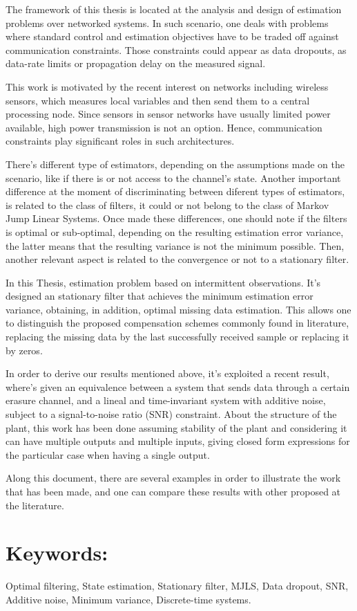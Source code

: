 The framework of this thesis is located at the analysis and design of estimation problems over networked systems. In such scenario, one deals with problems where standard control and estimation objectives have to be traded off against communication constraints. Those constraints could appear as data dropouts, as data-rate limits or propagation delay on the measured signal.

This work is motivated by the recent interest on networks including wireless sensors, which measures local variables and then send them to a central processing node. Since sensors in sensor networks have usually limited power available, high power transmission is not an option. Hence, communication constraints play significant roles in such architectures.

There's different type of estimators, depending on the assumptions made on the scenario, like if there is or not access to the channel's state. Another important difference at the moment of discriminating between diferent types of estimators, is related to the class of filters, it could or not belong to the class of Markov Jump Linear Systems. Once made these differences, one should note if the filters is optimal or sub-optimal, depending on the resulting estimation error variance, the latter means that the resulting variance is not the minimum possible. Then, another relevant aspect is related to the convergence or not to a stationary filter.

In this Thesis, estimation problem based on intermittent observations. It's designed an stationary filter that achieves the minimum estimation error variance, obtaining, in addition, optimal missing data estimation. This allows one to distinguish the proposed compensation schemes commonly found in literature, replacing the missing data by the last successfully received sample or replacing it by zeros.

In order to derive our results mentioned above, it's exploited a recent result, where's given an equivalence between a system that sends data through a certain erasure channel, and a lineal and time-invariant system with additive noise, subject to a signal-to-noise ratio (SNR) constraint. About the structure of the plant, this work has been done assuming stability of the plant and considering it can have multiple outputs and multiple inputs, giving closed form expressions for the particular case when having a single output.

Along this document, there are several examples in order to illustrate the work that has been made, and one can compare these results with other proposed at the literature.

\section*{Keywords:} Optimal filtering, State estimation, Stationary filter, MJLS, Data dropout, SNR, Additive noise, Minimum variance, Discrete-time systems.
